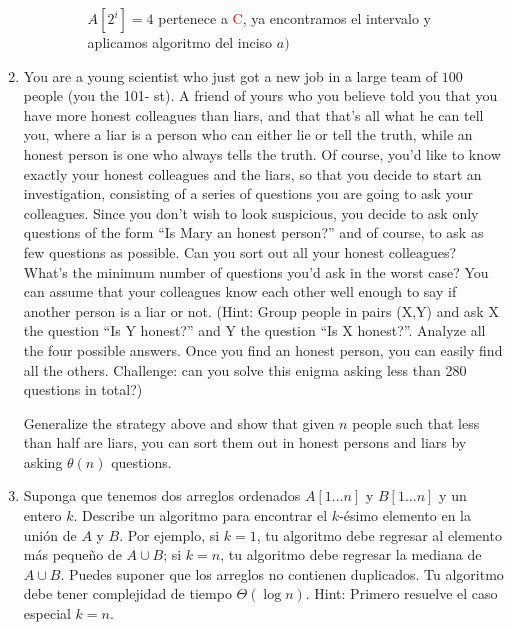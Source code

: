 \documentclass[letterpaper,11pt]{article}
\begin{document}
\begin{enumerate}
\begin{enumerate}
\begin{figure}[h!]
    
        \caption{$A[2^i] = 4$ pertenece a \textcolor{red}{C}, ya encontramos el 
                 intervalo y aplicamos algoritmo del inciso $a)$}
        \end{figure}
    \end{enumerate}
    
    \item You are a young scientist who just got a new job in a large team of 
    $100$ people (you the 101- st). A friend of yours who you believe told you 
    that you have more honest colleagues than liars, and that that’s all what 
    he can tell you, where a liar is a person who can either lie or tell the 
    truth, while an honest person is one who always tells the truth. Of course, 
    you’d like to know exactly your honest colleagues and the liars, so that 
    you decide to start an investigation, consisting of a series of questions 
    you are going to ask your colleagues. Since you don’t wish to look 
    suspicious, you decide to ask only questions of the form “Is Mary an honest 
    person?” and of course, to ask as few questions as possible. Can you sort 
    out all your honest colleagues? What’s the minimum number of questions you’d 
    ask in the worst case? You can assume that your colleagues know each other 
    well enough to say if another person is a liar or not. (Hint: Group people 
    in pairs (X,Y) and ask X the question “Is Y honest?” and Y the question 
    “Is X honest?”. Analyze all the four possible answers. Once you find an 
    honest person, you can easily find all the others. Challenge: can you solve 
    this enigma asking less than 280 questions in total?)
    
    Generalize the strategy above and show that given $n$ people such that less 
    than half are liars, you can sort them out in honest persons and liars by 
    asking $\theta(n)$ questions.

    \item Suponga que tenemos dos arreglos ordenados $A[1 \dots n]$ y 
    $B[1 \dots n]$ y un entero $k$. Describe un algoritmo para encontrar el 
    $k$-ésimo elemento en la unión de $A$ y $B$. Por ejemplo, si $k = 1$, tu 
    algoritmo debe regresar al elemento más pequeño de $A \cup B$; si $k = n$, tu 
    algoritmo debe regresar la mediana de $A \cup B$. Puedes suponer que los 
    arreglos no contienen duplicados. Tu algoritmo debe tener complejidad de 
    tiempo $\Theta(\log n)$. Hint: Primero resuelve el caso especial $k = n$.


\end{enumerate}
\end{document}
